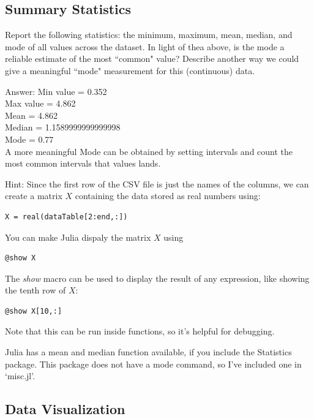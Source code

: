 \documentclass{article}
\def\ans#1{\par\gre{Answer: #1}}
\def\blu#1{{\color{blu}#1}}
\def\gre#1{{\color{gre}#1}}
\begin{document}
\subsection{Summary Statistics}

\blu{Report the following statistics}: the minimum, maximum, mean, median, and mode of all values across the dataset. In light of thea above, \blu{is the mode a reliable estimate of the most ``common" value? Describe another way we could give a meaningful ``mode" measurement for this (continuous) data.}
\ans{Min value = 0.352\\Max value = 4.862\\ Mean = 4.862\\
Median = 1.1589999999999998 \\ Mode = 0.77\\
A more meaningful Mode can be obtained by setting intervals and count the most common intervals that values lands.
}

Hint: Since the first row of the CSV file is just the names of the columns, we can create a matrix $X$ containing the data stored as real numbers using:
\begin{verbatim}
X = real(dataTable[2:end,:])
\end{verbatim}
You can make Julia dispaly the matrix $X$ using
\begin{verbatim}
@show X
\end{verbatim}
The \emph{show} macro can be used to display the result of any expression, like showing the tenth row of $X$:
\begin{verbatim}
@show X[10,:]
\end{verbatim}
Note that this can be run inside functions, so it's helpful for debugging.

Julia has a mean and median function available, if you include the Statistics package. This package does not have a mode command, so I've included one in `misc.jl'.


\subsection{Data Visualization}
\end{document}
